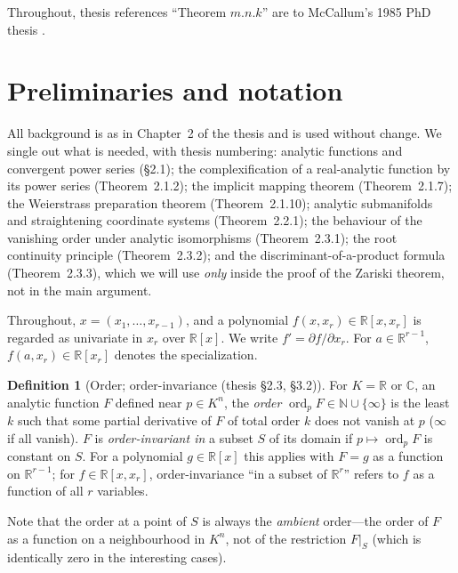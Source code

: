 \documentclass[11pt,a4paper]{article}
\theoremstyle{plain}
\theoremstyle{definition}
\newtheorem{definition}[theorem]{Definition}
\newcommand{\R}{\mathbb{R}}
\newcommand{\C}{\mathbb{C}}
\newcommand{\N}{\mathbb{N}}
\DeclareMathOperator{\ord}{ord}
\begin{document}
Throughout, thesis references ``Theorem $m.n.k$'' are to McCallum's 1985 PhD
thesis \cite{McCallum85}.

\section{Preliminaries and notation}\label{sec:prelim}

All background is as in Chapter~2 of the thesis and is used without change.
We single out what is needed, with thesis numbering:
analytic functions and convergent power series (\S2.1); the complexification
of a real-analytic function by its power series (Theorem~2.1.2); the implicit
mapping theorem (Theorem~2.1.7); the Weierstrass preparation theorem
(Theorem~2.1.10); analytic submanifolds and straightening coordinate systems
(Theorem~2.2.1); the behaviour of the vanishing order under analytic
isomorphisms (Theorem~2.3.1); the root continuity principle (Theorem~2.3.2);
and the discriminant-of-a-product formula (Theorem~2.3.3), which we will use
\emph{only} inside the proof of the Zariski theorem, not in the main argument.

Throughout, $x=(x_1,\dots,x_{r-1})$, and a polynomial
$f(x,x_r)\in\R[x,x_r]$ is regarded as univariate in $x_r$ over $\R[x]$. We
write $f'=\partial f/\partial x_r$. For $a\in\R^{r-1}$, $f(a,x_r)\in\R[x_r]$
denotes the specialization.

\begin{definition}[Order; order-invariance (thesis \S2.3, \S3.2)]
For $K=\R$ or $\C$, an analytic function $F$ defined near $p\in K^n$, the
\emph{order} $\ord_p F\in\N\cup\{\infty\}$ is the least $k$ such that some
partial derivative of $F$ of total order $k$ does not vanish at $p$ ($\infty$
if all vanish). $F$ is \emph{order-invariant in} a subset $S$ of its domain if
$p\mapsto\ord_p F$ is constant on $S$. For a polynomial
$g\in\R[x]$ this applies with $F=g$ as a function on $\R^{r-1}$; for
$f\in\R[x,x_r]$, order-invariance ``in a subset of $\R^r$'' refers to $f$ as a
function of all $r$ variables.
\end{definition}

Note that the order at a point of $S$ is always the \emph{ambient} order---the
order of $F$ as a function on a neighbourhood in $K^n$, not of the restriction
$F|_S$ (which is identically zero in the interesting cases).
\end{document}

